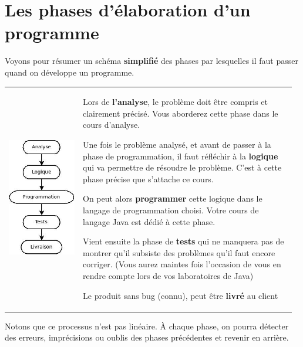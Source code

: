 \section{Les phases d'élaboration d'un programme}

	Voyons pour résumer un schéma \textbf{simplifié} des phases par
	lesquelles il faut passer quand on développe un programme.

	\begin{tabular}{m{0.25\linewidth}m{0.72\linewidth}}
	\vspace{-1cm}
	\includegraphics[width=3.5cm]{image/intro-phases-develop}
	&
	\begin{liste}
	\item 
		Lors de \textbf{l'analyse}, le problème doit être
		compris et clairement précisé. Vous aborderez cette phase dans le cours
		d'analyse.
	\item
		Une fois le problème analysé, et avant de passer à la phase de
		programmation, il faut réfléchir à la \textbf{logique} qui va permettre
		de résoudre le problème. C'est à cette phase précise
		que s'attache ce cours.
	\item
		On peut alors \textbf{programmer} cette logique dans le langage de
		programmation choisi. Votre cours de langage Java est dédié à cette
		phase.
	\item
		Vient ensuite la phase de \textbf{tests} qui ne manquera pas de montrer
		qu'il subsiste des problèmes qu'il
		faut encore corriger. (Vous aurez maintes fois
		l'occasion de vous en rendre compte lors de vos
		laboratoires de Java)
	\item
		Le produit sans bug (connu), peut être \textbf{livré} au client
	\end{liste}
	\\
	\end{tabular}
	
	Notons que ce processus n'est pas linéaire. À chaque
	phase, on pourra détecter des erreurs, imprécisions ou oublis des
	phases précédentes et revenir en arrière.

